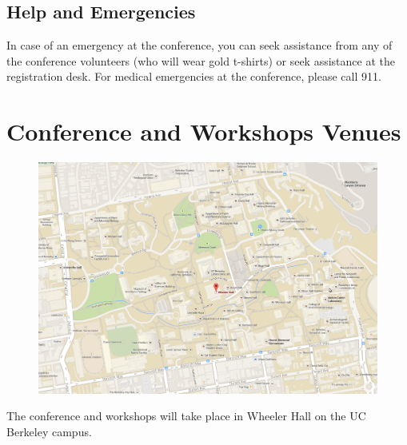 \vspace{3mm}
\subsection*{Help and Emergencies}
In case of an emergency at the conference, you can seek assistance from any of the conference volunteers (who will wear gold t-shirts) or seek assistance at the registration desk. For medical emergencies at the conference, please call 911.

\clearpage
{} \section{Conference and Workshops Venues}
\begin{figure}[h!]
\includegraphics[width=\linewidth]{local_img/maps/wheeler_hall}
\end{figure}
\vspace{0.3cm}
{\Large The conference and workshops will take place in Wheeler Hall on the UC Berkeley campus.}

